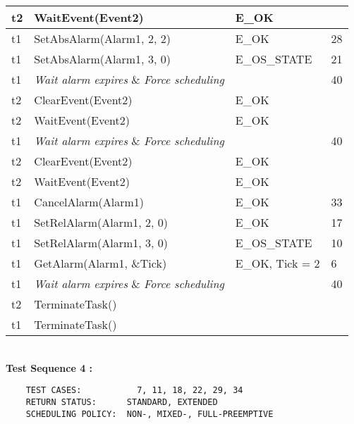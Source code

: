 \documentclass[10pt]{article}
\newlength{\Li}\settowidth{\Li}{Running}
\newlength{\Lii}\setlength{\Lii}{7cm}
\newlength{\Liiii}\setlength{\Liiii}{0.9cm}
\newlength{\Liii}\setlength{\Liii}{\textwidth} \addtolength{\Liii}{-\Li} \addtolength{\Liii}{-\Lii} \addtolength{\Liii}{-\Liiii}
\begin{document}
	\begin{supertabular}{|p{\Li}|p{\Lii}|p{\Liii}|p{\Liiii}|} \hline 
	t2	& WaitEvent(Event2) 							& E\_OK			& \\ \hline 
	t1	& SetAbsAlarm(Alarm1, 2, 2)						& E\_OK 			& 28 \\ \hline 
	t1	& SetAbsAlarm(Alarm1, 3, 0)						& E\_OS\_STATE 	& 21 \\ \hline 
	t1	& \textit{Wait alarm expires} \& \textit{Force scheduling} 	& 				& 40 \\ \hline 
	t2	& ClearEvent(Event2) 							& E\_OK 			&\\ \hline 
	t2	& WaitEvent(Event2)								& E\_OK			& \\ \hline 
	t1	& \textit{Wait alarm expires} \& \textit{Force scheduling} 	& 				& 40 \\ \hline 
	t2 	& ClearEvent(Event2) 							& E\_OK			& \\ \hline 
	t2	& WaitEvent(Event2)								& E\_OK			& \\ \hline 
	t1	& CancelAlarm(Alarm1) 							& E\_OK			& 33 \\ \hline 
	t1	& SetRelAlarm(Alarm1, 2, 0)						& E\_OK			& 17 \\ \hline 
	t1	& SetRelAlarm(Alarm1, 3, 0)						& E\_OS\_STATE 	& 10 \\ \hline 
	t1	& GetAlarm(Alarm1, \&Tick) 						& E\_OK, Tick = 2	& 6 \\ \hline 
	t1	& \textit{Wait alarm expires} \& \textit{Force scheduling} 	& 				& 40 \\ \hline 
	t2 	& TerminateTask() 								& 				& \\ \hline 
	t1	& TerminateTask()								&				&\\ \hline 
	\end{supertabular} \\
	
	\textbf{Test Sequence 4 :}
	\begin{lstlisting}
	TEST CASES:		      7, 11, 18, 22, 29, 34
	RETURN STATUS:	    STANDARD, EXTENDED
	SCHEDULING POLICY:  NON-, MIXED-, FULL-PREEMPTIVE
	\end{lstlisting}
	
	
\end{document}
